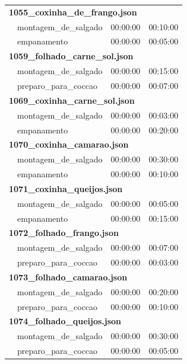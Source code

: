 \documentclass[12pt,a4paper]{article}
\begin{document}
\begin{longtable}{p{4.5cm}p{5.5cm}cc}
\multicolumn{4}{l}{\textbf{1055\_coxinha\_de\_frango.json}} \\
& montagem\_de\_salgado & 00:00:00 & 00:10:00 \\
& empanamento & 00:00:00 & 00:05:00 \\
\midrule

\multicolumn{4}{l}{\textbf{1059\_folhado\_carne\_sol.json}} \\
& montagem\_de\_salgado & 00:00:00 & 00:15:00 \\
& preparo\_para\_coccao & 00:00:00 & 00:07:00 \\
\midrule

\multicolumn{4}{l}{\textbf{1069\_coxinha\_carne\_sol.json}} \\
& montagem\_de\_salgado & 00:00:00 & 00:03:00 \\
& empanamento & 00:00:00 & 00:20:00 \\
\midrule

\multicolumn{4}{l}{\textbf{1070\_coxinha\_camarao.json}} \\
& montagem\_de\_salgado & 00:00:00 & 00:30:00 \\
& empanamento & 00:00:00 & 00:10:00 \\
\midrule

\multicolumn{4}{l}{\textbf{1071\_coxinha\_queijos.json}} \\
& montagem\_de\_salgado & 00:00:00 & 00:05:00 \\
& empanamento & 00:00:00 & 00:15:00 \\
\midrule

\multicolumn{4}{l}{\textbf{1072\_folhado\_frango.json}} \\
& montagem\_de\_salgado & 00:00:00 & 00:07:00 \\
& preparo\_para\_coccao & 00:00:00 & 00:03:00 \\
\midrule

\multicolumn{4}{l}{\textbf{1073\_folhado\_camarao.json}} \\
& montagem\_de\_salgado & 00:00:00 & 00:20:00 \\
& preparo\_para\_coccao & 00:00:00 & 00:10:00 \\
\midrule

\multicolumn{4}{l}{\textbf{1074\_folhado\_queijos.json}} \\
& montagem\_de\_salgado & 00:00:00 & 00:30:00 \\
& preparo\_para\_coccao & 00:00:00 & 00:05:00 \\

\bottomrule
\end{longtable}
\end{document}
